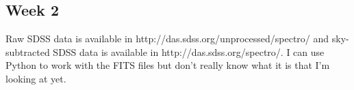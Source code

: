\documentclass[12pt]{article}
\begin{document}
\subsection*{Week 2}
Raw SDSS data is available in http://das.sdss.org/unprocessed/spectro/ and sky-subtracted SDSS data is available in http://das.sdss.org/spectro/.  I can use Python to work with the FITS files but don't really know what it is that I'm looking at yet.
\end{document}
